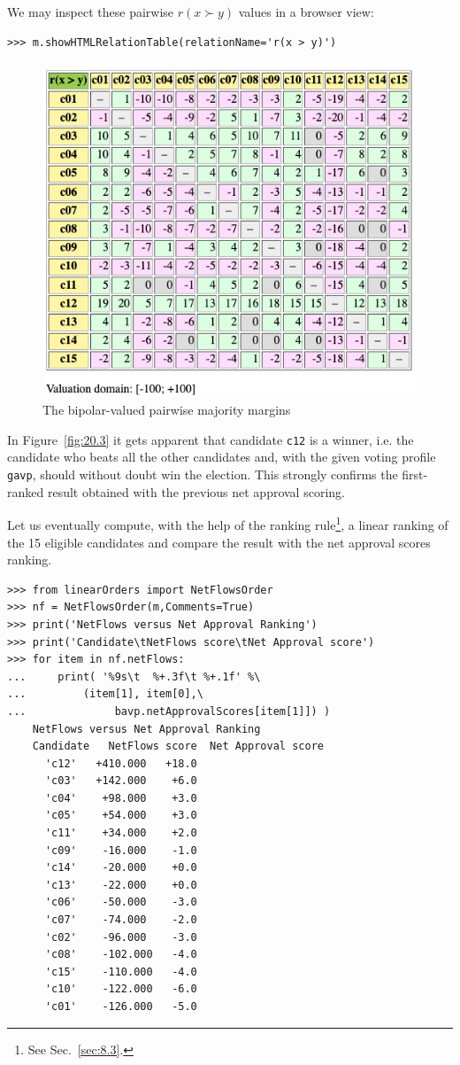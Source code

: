 We may inspect these pairwise $r(x \succ y)$ values in a browser view: 
\begin{lstlisting}
>>> m.showHTMLRelationTable(relationName='r(x > y)')
\end{lstlisting}
\begin{figure}[ht]
\includegraphics[width=0.9\hsize]{Figures/20-3-majMargAV.png}
\caption{The bipolar-valued pairwise majority margins} 
\label{fig:20.3}       %
\end{figure}

In Figure~\vref{fig:20.3} it gets apparent that candidate \texttt{c12} is a \Condorcet winner, i.e. the candidate who beats all the other candidates and, with the given voting profile \texttt{gavp}, should without doubt win the election. This strongly confirms the first-ranked result obtained with the previous net approval scoring. 

Let us eventually compute, with the help of the \NetFlows ranking rule\footnote{See Sec.~\ref{sec:8.3}.}, a linear ranking of the 15 eligible candidates and compare the result with the net approval scores ranking.
\begin{lstlisting}[caption={Comparing the net approval and the \NetFlows rankings},label=list:20.10]
>>> from linearOrders import NetFlowsOrder
>>> nf = NetFlowsOrder(m,Comments=True)
>>> print('NetFlows versus Net Approval Ranking')
>>> print('Candidate\tNetFlows score\tNet Approval score')
>>> for item in nf.netFlows:
...     print( '%9s\t  %+.3f\t %+.1f' %\
...	        (item[1], item[0],\
...              bavp.netApprovalScores[item[1]]) ) 
    NetFlows versus Net Approval Ranking
    Candidate	NetFlows score	Net Approval score
      'c12'	  +410.000	 +18.0
      'c03'	  +142.000	  +6.0
      'c04'	   +98.000	  +3.0
      'c05'	   +54.000	  +3.0
      'c11'	   +34.000	  +2.0
      'c09'	   -16.000	  -1.0
      'c14'	   -20.000	  +0.0
      'c13'	   -22.000	  +0.0
      'c06'	   -50.000	  -3.0
      'c07'	   -74.000	  -2.0
      'c02'	   -96.000	  -3.0
      'c08'	   -102.000	  -4.0
      'c15'	   -110.000	  -4.0
      'c10'	   -122.000	  -6.0
      'c01'	   -126.000	  -5.0
\end{lstlisting}

